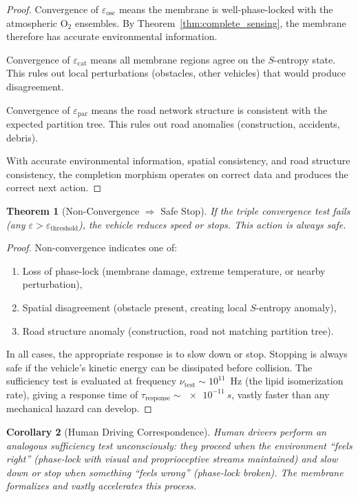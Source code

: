 \documentclass[12pt]{article}
\newtheorem{theorem}{Theorem}[section]
\newtheorem{corollary}[theorem]{Corollary}
\theoremstyle{definition}
\theoremstyle{remark}
\begin{document}
\begin{proof}
Convergence of $\varepsilon_{\mathrm{osc}}$ means the membrane is well-phase-locked with the atmospheric $\mathrm{O}_2$ ensembles. By Theorem~\ref{thm:complete_sensing}, the membrane therefore has accurate environmental information.

Convergence of $\varepsilon_{\mathrm{cat}}$ means all membrane regions agree on the $S$-entropy state. This rules out local perturbations (obstacles, other vehicles) that would produce disagreement.

Convergence of $\varepsilon_{\mathrm{par}}$ means the road network structure is consistent with the expected partition tree. This rules out road anomalies (construction, accidents, debris).

With accurate environmental information, spatial consistency, and road structure consistency, the completion morphism operates on correct data and produces the correct next action.
\end{proof}

\begin{theorem}[Non-Convergence $\Rightarrow$ Safe Stop]
\label{thm:non_convergence}
If the triple convergence test fails (any $\varepsilon > \varepsilon_{\mathrm{threshold}}$), the vehicle reduces speed or stops. This action is always safe.
\end{theorem}

\begin{proof}
Non-convergence indicates one of:
\begin{enumerate}[label=(\alph*)]
  \item Loss of phase-lock (membrane damage, extreme temperature, or nearby perturbation),
  \item Spatial disagreement (obstacle present, creating local $S$-entropy anomaly),
  \item Road structure anomaly (construction, road not matching partition tree).
\end{enumerate}
In all cases, the appropriate response is to slow down or stop. Stopping is always safe if the vehicle's kinetic energy can be dissipated before collision. The sufficiency test is evaluated at frequency $\nu_{\mathrm{test}} \sim 10^{11}$~Hz (the lipid isomerization rate), giving a response time of $\tau_{\mathrm{response}} \sim \SI{e-11}{s}$, vastly faster than any mechanical hazard can develop.
\end{proof}

\begin{corollary}[Human Driving Correspondence]
\label{cor:human_driving}
Human drivers perform an analogous sufficiency test unconsciously: they proceed when the environment ``feels right'' (phase-lock with visual and proprioceptive streams maintained) and slow down or stop when something ``feels wrong'' (phase-lock broken). The membrane formalizes and vastly accelerates this process.
\end{corollary}
\end{document}
